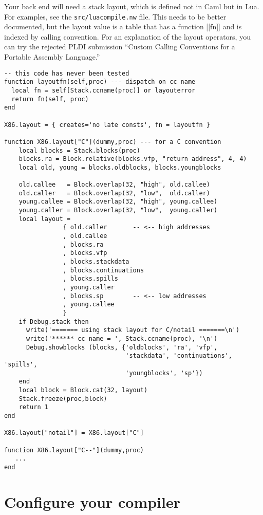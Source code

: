 \documentclass[12pt]{article}
\begin{document}
Your back end will need a stack layout, which is defined not in Caml
but in Lua.
For examples, see the \texttt{src/luacompile.nw} file.
This needs to be better documented, but the layout value is a table
that has a function [[fn]] and is indexed by calling convention.
For an explanation of the layout operators, you can
try the rejected PLDI submission ``Custom Calling Conventions for a
Portable Assembly Language.''
\begin{verbatim}
-- this code has never been tested
function layoutfn(self,proc) --- dispatch on cc name
  local fn = self[Stack.ccname(proc)] or layouterror
  return fn(self, proc)
end

X86.layout = { creates='no late consts', fn = layoutfn }

function X86.layout["C"](dummy,proc) --- for a C convention 
    local blocks = Stack.blocks(proc)
    blocks.ra = Block.relative(blocks.vfp, "return address", 4, 4)
    local old, young = blocks.oldblocks, blocks.youngblocks

    old.callee   = Block.overlap(32, "high", old.callee)
    old.caller   = Block.overlap(32, "low",  old.caller)
    young.callee = Block.overlap(32, "high", young.callee)
    young.caller = Block.overlap(32, "low",  young.caller)
    local layout = 
                { old.caller       -- <-- high addresses
                , old.callee
                , blocks.ra
                , blocks.vfp
                , blocks.stackdata
                , blocks.continuations
                , blocks.spills
                , young.caller
                , blocks.sp        -- <-- low addresses 
                , young.callee
                }
    if Debug.stack then
      write('======= using stack layout for C/notail =======\n')
      write('****** cc name = ', Stack.ccname(proc), '\n')
      Debug.showblocks (blocks, {'oldblocks', 'ra', 'vfp',
                                 'stackdata', 'continuations', 'spills',
                                 'youngblocks', 'sp'})
    end
    local block = Block.cat(32, layout)
    Stack.freeze(proc,block)
    return 1
end    

X86.layout["notail"] = X86.layout["C"]

function X86.layout["C--"](dummy,proc)
   ...
end    
\end{verbatim}


\section{Configure your compiler}
\end{document}
